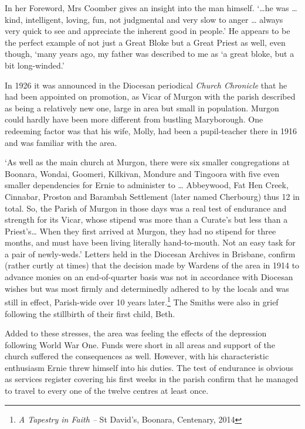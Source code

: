 In her Foreword, Mrs Coomber gives an insight into the man himself.
`\ldots he was \ldots{} kind, intelligent, loving, fun, not judgmental
and very slow to anger \ldots{} always very quick to see and appreciate
the inherent good in people.' He appears to be the perfect example of
not just a Great Bloke but a Great Priest as well, even though, `many
years ago, my father was described to me as `a great bloke, but a bit
long-winded.'

In 1926 it was announced in the Diocesan periodical \emph{Church
Chronicle} that he had been appointed on promotion, as Vicar of Murgon
with the parish described as being a relatively new one, large in area
but small in population. Murgon could hardly have been more different
from bustling Maryborough. One redeeming factor was that his wife,
Molly, had been a pupil-teacher there in 1916 and was familiar with the
area.

`As well as the main church at Murgon, there were six smaller
congregations at Boonara, Wondai, Goomeri, Kilkivan, Mondure and
Tingoora with five even smaller dependencies for Ernie to administer to
\ldots{} Abbeywood, Fat Hen Creek, Cinnabar, Proston and Barambah
Settlement (later named Cherbourg) thus 12 in total. So, the Parish of
Murgon in those days was a real test of endurance and strength for its
Vicar, whose stipend was more than a Curate's but less than a
Priest's\ldots{} When they first arrived at Murgon, they had no stipend
for three months, and must have been living literally hand-to-mouth. Not
an easy task for a pair of newly-weds.' Letters held in the Diocesan
Archives in Brisbane, confirm (rather curtly at times) that the decision
made by Wardens of the area in 1914 to advance monies on an
end-of-quarter basis was not in accordance with Diocesan wishes but was
most firmly and determinedly adhered to by the locals and was still in
effect, Parish-wide over 10 years later.\footnote{\emph{A Tapestry in
  Faith --} St David's, Boonara, Centenary, 2014} The Smiths were also
in grief following the stillbirth of their first child, Beth.

Added to these stresses, the area was feeling the effects of the
depression following World War One. Funds were short in all areas and
support of the church suffered the consequences as well. However, with
his characteristic enthusiasm Ernie threw himself into his duties. The
test of endurance is obvious as services register covering his first
weeks in the parish confirm that he managed to travel to every one of
the twelve centres at least once.

